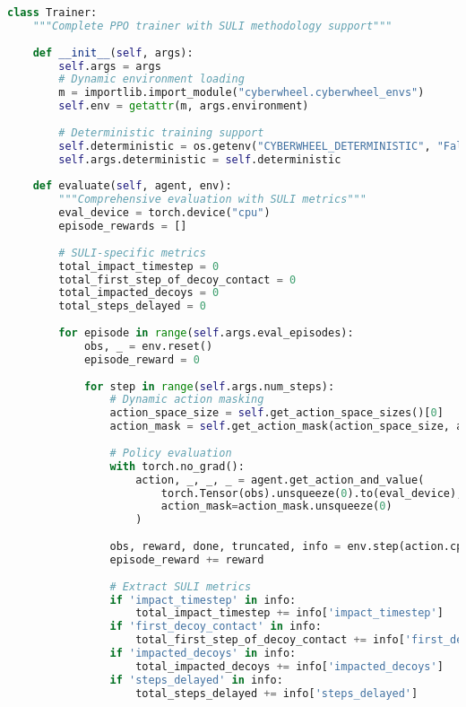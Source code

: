 \documentclass[12pt,a4paper]{article}
\begin{document}
\begin{lstlisting}[language=Python, caption=Core Trainer Implementation]
class Trainer:
    """Complete PPO trainer with SULI methodology support"""
    
    def __init__(self, args):
        self.args = args
        # Dynamic environment loading
        m = importlib.import_module("cyberwheel.cyberwheel_envs")
        self.env = getattr(m, args.environment)
        
        # Deterministic training support
        self.deterministic = os.getenv("CYBERWHEEL_DETERMINISTIC", "False").lower() in ('true', '1', 't')
        self.args.deterministic = self.deterministic
        
    def evaluate(self, agent, env):
        """Comprehensive evaluation with SULI metrics"""
        eval_device = torch.device("cpu")
        episode_rewards = []
        
        # SULI-specific metrics
        total_impact_timestep = 0
        total_first_step_of_decoy_contact = 0
        total_impacted_decoys = 0
        total_steps_delayed = 0
        
        for episode in range(self.args.eval_episodes):
            obs, _ = env.reset()
            episode_reward = 0
            
            for step in range(self.args.num_steps):
                # Dynamic action masking
                action_space_size = self.get_action_space_sizes()[0]
                action_mask = self.get_action_mask(action_space_size, action_masks)
                
                # Policy evaluation
                with torch.no_grad():
                    action, _, _, _ = agent.get_action_and_value(
                        torch.Tensor(obs).unsqueeze(0).to(eval_device),
                        action_mask=action_mask.unsqueeze(0)
                    )
                
                obs, reward, done, truncated, info = env.step(action.cpu().numpy()[0])
                episode_reward += reward
                
                # Extract SULI metrics
                if 'impact_timestep' in info:
                    total_impact_timestep += info['impact_timestep']
                if 'first_decoy_contact' in info:
                    total_first_step_of_decoy_contact += info['first_decoy_contact']
                if 'impacted_decoys' in info:
                    total_impacted_decoys += info['impacted_decoys']
                if 'steps_delayed' in info:
                    total_steps_delayed += info['steps_delayed']
                

\end{lstlisting}
\end{document}
